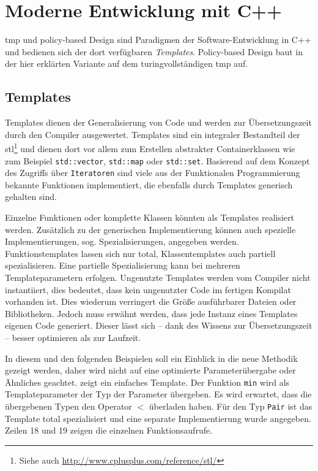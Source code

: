 \chapter{Moderne Entwicklung mit C++}
\label{chap:impl_tmp}
\acf{tmp} und policy-based Design \cite{Alexandrescu2001Modern} sind Paradigmen der Software-Entwicklung in C++ und bedienen sich der dort verfügbaren \emph{Templates}. Policy-based Design baut in der hier erklärten Variante auf dem turingvollständigen \ac{tmp} auf.

\section{Templates}
Templates dienen der Generalisierung von Code und werden zur Übersetzungszeit durch den Compiler ausgewertet. Templates sind ein integraler Bestandteil der \ac{stl}\footnote{Siehe auch \url{http://www.cplusplus.com/reference/stl/}} und dienen dort vor allem zum Erstellen abstrakter Containerklassen wie zum Beispiel \texttt{std::vector}, \texttt{std::map} oder \texttt{std::set}. Basierend auf dem Konzept des Zugriffs über \texttt{Iteratoren} sind viele aus der Funktionalen Programmierung bekannte Funktionen implementiert, die ebenfalls durch Templates generisch gehalten sind.

Einzelne Funktionen oder komplette Klassen könnten als Templates realisiert werden. Zusätzlich zu der generischen Implementierung können auch spezielle Implementierungen, sog. Spezialisierungen, angegeben werden. Funktionstemplates lassen sich nur total, Klassentemplates auch partiell spezialisieren. Eine partielle Spezialisierung kann bei mehreren Templateparametern erfolgen. Ungenutzte Templates werden vom Compiler nicht instantiiert, dies bedeutet, dass kein ungenutzter Code im fertigen Kompilat vorhanden ist. Dies wiederum verringert die Größe ausführbarer Dateien oder Bibliotheken. Jedoch muss erwähnt werden, dass jede Instanz eines Templates eigenen Code generiert. Dieser lässt sich -- dank des Wissens zur Übersetzungszeit -- besser optimieren als zur Laufzeit.

In diesem und den folgenden Beispielen soll ein Einblick in die neue Methodik gezeigt werden, daher wird nicht auf eine optimierte Parameterübergabe oder Ähnliches geachtet.  zeigt ein einfaches Template. Der Funktion \texttt{min} wird als Templateparameter der Typ der Parameter übergeben. Es wird erwartet, dass die übergebenen Typen den Operator $<$ überladen haben. Für den Typ \texttt{Pair} ist das Template total spezialisiert und eine separate Implementierung wurde angegeben. Zeilen 18 und 19 zeigen die einzelnen Funktionsaufrufe.

